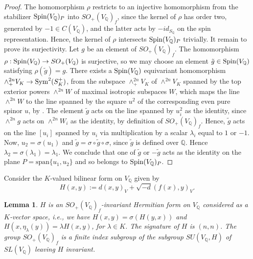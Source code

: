 \documentclass[12pt]{amsart}
\numberwithin{equation}{subsection}
\theoremstyle{plain}
\newtheorem{lem}[thm]{Lemma}
\theoremstyle{definition}
\newcommand{\QQ}{{\mathbb Q}}
\newcommand{\cm}{\eta}
\newcommand{\Spin}{{\rm Spin}}
\newcommand{\Sym}{{\rm Sym}}
\begin{document}
\begin{proof}
The homomorphism $\rho$ restricts to an injective homomorphism from the stabilizer $\Spin(V_\QQ)_P$ into $SO_+(V_\QQ)_f$, 
since the kernel of $\rho$ has order two, generated by $-1\in C(V_\QQ)$, and the latter acts by $-id_{S_\QQ}$ on the spin representation. Hence, the kernel of $\rho$ intersects $\Spin(V_\QQ)_P$ trivially.
It remain to prove its surjectivity.
Let $g$ be an element of  $SO_+(V_\QQ)_f$. The homomorphism $\rho:\Spin(V_\QQ)\rightarrow SO_+(V_\QQ)$
is surjective, so we may choose an element $\tilde{g}\in\Spin(V_\QQ)$ satisfying $\rho(\tilde{g})=g$.
There exists a $\Spin(V_\QQ)$ equivariant homomorphism 
$\wedge_+^{2n}V_K\rightarrow \Sym^2(S^+_K)$, from the subspace $\wedge^{2n}_+V_K$ of $\wedge^{2n}V_K$ spanned by the top exterior powers $\wedge^{2n}W$ of maximal isotropic subspaces $W$, which maps the line $\wedge^{2n}W$ to the line spanned by the square $u^2$ of the corresponding even pure spinor $u$, by
\cite[III.3.2 and III.4.5]{chevalley}. 
The element $\tilde{g}$ acts on the line spanned by $u_i^2$ as the identity, since $\wedge^{2n}g$ acts on 
$\wedge^{2n}W_i$ as the identity, by definition of $SO_+(V_\QQ)_f$. Hence,
$\tilde{g}$ acts on the line $[u_i]$ spanned by $u_i$ via multiplication by a scalar $\lambda_i$ equal to $1$ or $-1$. Now, $u_2=\sigma(u_1)$ and $\tilde{g}=\sigma\circ \tilde{g} \circ \sigma$, since $\tilde{g}$ is defined over $\QQ$. Hence $\lambda_2=\sigma(\lambda_1)=\lambda_1$. We conclude that one of $\tilde{g}$ or $-\tilde{g}$ 
acts as the identity on the plane $P=\mbox{span}\{u_1,u_2\}$ and so belongs to $\Spin(V_\QQ)_P$.
\end{proof}

Consider the $K$-valued bilinear form on $V_\QQ$ given by
\begin{equation}
\label{eq-H}
H(x,y):=d(x,y)_V+\sqrt{-d}(f(x),y)_V.
\end{equation}

\begin{lem}
\label{lemma-su-3-3}
$H$ is an $SO_+(V_\QQ)_f $-invariant Hermitian form on $V_\QQ$ considered as a $K$-vector space, i.e., we have
$H(x,y)=\sigma(H(y,x))$ and $H(x,\cm_\lambda(y))=\lambda H(x,y)$, for $\lambda\in K$. The signature of $H$ is $(n,n)$. 
The group $SO_+(V_\QQ)_f$ is a finite index subgroup of the subgroup $SU(V_\QQ,H)$ of $SL(V_\QQ)$ leaving $H$ invariant. 
\end{lem}
\end{document}
